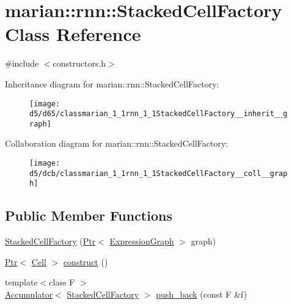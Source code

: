 \hypertarget{classmarian_1_1rnn_1_1StackedCellFactory}{}\section{marian\+:\+:rnn\+:\+:Stacked\+Cell\+Factory Class Reference}
\label{classmarian_1_1rnn_1_1StackedCellFactory}


{\ttfamily \#include $<$constructors.\+h$>$}



Inheritance diagram for marian\+:\+:rnn\+:\+:Stacked\+Cell\+Factory\+:
\nopagebreak
\begin{figure}[H]
\begin{center}
\leavevmode
\texttt{[image: d5/d65/classmarian\_1\_1rnn\_1\_1StackedCellFactory\_\_inherit\_\_graph]}
\end{center}
\end{figure}


Collaboration diagram for marian\+:\+:rnn\+:\+:Stacked\+Cell\+Factory\+:
\nopagebreak
\begin{figure}[H]
\begin{center}
\leavevmode
\texttt{[image: d5/dcb/classmarian\_1\_1rnn\_1\_1StackedCellFactory\_\_coll\_\_graph]}
\end{center}
\end{figure}
\subsection*{Public Member Functions}
\begin{DoxyCompactItemize}
\item 
\hyperlink{classmarian_1_1rnn_1_1StackedCellFactory_a3566c87519f1a3d75acefdeb28c1fac0}{Stacked\+Cell\+Factory} (\hyperlink{namespacemarian_ad1a373be43a00ef9ce35666145137b08}{Ptr}$<$ \hyperlink{classmarian_1_1ExpressionGraph}{Expression\+Graph} $>$ graph)
\item 
\hyperlink{namespacemarian_ad1a373be43a00ef9ce35666145137b08}{Ptr}$<$ \hyperlink{classmarian_1_1rnn_1_1Cell}{Cell} $>$ \hyperlink{classmarian_1_1rnn_1_1StackedCellFactory_acfcb72125e0e6263f8af71d4b19210ba}{construct} ()
\item 
{\footnotesize template$<$class F $>$ }\\\hyperlink{classmarian_1_1Accumulator}{Accumulator}$<$ \hyperlink{classmarian_1_1rnn_1_1StackedCellFactory}{Stacked\+Cell\+Factory} $>$ \hyperlink{classmarian_1_1rnn_1_1StackedCellFactory_ae927a1573ba34933dec52f02b9b66aab}{push\+\_\+back} (const F \&f)
\end{DoxyCompactItemize}
